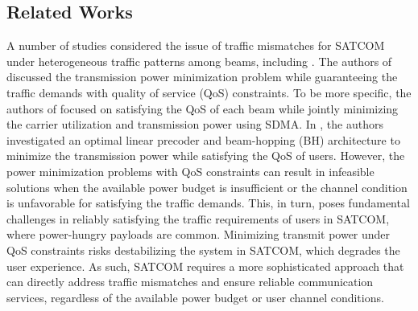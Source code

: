 \documentclass[draftclsnofoot, onecolumn, comsoc, 12pt]{IEEEtran}
\begin{document}
\subsection{Related Works}
{A number of studies considered the issue of traffic mismatches for SATCOM under heterogeneous traffic patterns among beams, including \cite{abdu2021flexible, ha2022geo, wang2020noma, lin2022multi, zheng2012generic, liu2019qos, 9769901, cui2023energy}.}
{The authors of \cite{abdu2021flexible, ha2022geo} discussed the transmission power minimization problem while guaranteeing the traffic demands with quality of service (QoS) constraints.}
{To be more specific, the authors of \cite{abdu2021flexible} focused on satisfying the QoS of each beam while jointly minimizing the carrier utilization and transmission power using SDMA.}
{In \cite{ha2022geo}, the authors investigated an optimal linear precoder and beam-hopping (BH) architecture to minimize the transmission power while satisfying the QoS of users.}
{ However, the power minimization problems with QoS constraints \cite{abdu2021flexible, ha2022geo} can result in infeasible solutions when the available power budget is insufficient or the channel condition is unfavorable for satisfying the traffic demands. This, in turn, poses fundamental challenges in reliably satisfying the traffic requirements of users in SATCOM, where power-hungry payloads are common.
Minimizing transmit power under QoS constraints risks destabilizing the system in SATCOM, which degrades the user experience. As such, SATCOM requires a more sophisticated approach that can directly address traffic mismatches and ensure reliable communication services, regardless of the available power budget or user channel conditions.} 
\end{document}
